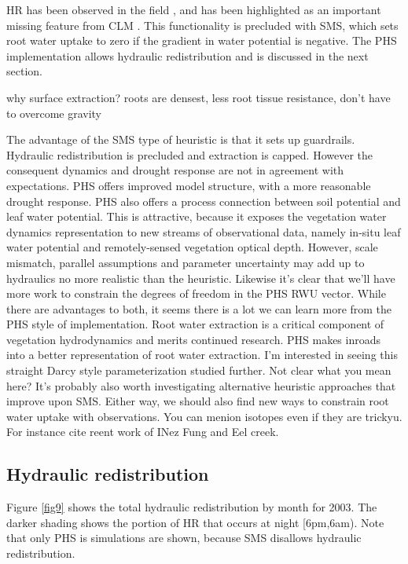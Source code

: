 \documentclass[draft,linenumbers]{agujournal}
\begin{document}
HR has been observed in the field \citep{oliveira2005}, and has been highlighted as an important missing feature from CLM \citep{lee2005}.
This functionality is precluded with SMS, which sets root water uptake to zero if the gradient in water potential is negative. 
The PHS implementation allows hydraulic redistribution and is discussed in the next section.

why surface extraction?
roots are densest, less root tissue resistance, don't have to overcome gravity

The advantage of the SMS type of heuristic is that it sets up guardrails.
Hydraulic redistribution is precluded and extraction is capped.
However the consequent dynamics and drought response are not in agreement with expectations.
PHS offers improved model structure, with a more reasonable drought response.
PHS also offers a process connection between soil potential and leaf water potential.
This is attractive, because it exposes the vegetation water dynamics representation to new streams of observational data, 
namely in-situ leaf water potential and remotely-sensed vegetation optical depth.
However, scale mismatch, parallel assumptions and parameter uncertainty may add up to hydraulics no more realistic than the heuristic.
Likewise it's clear that we'll have more work to constrain the degrees of freedom in the PHS RWU vector.
While there are advantages to both, it seems there is a lot we can learn more from the PHS style of implementation.
Root water extraction is a critical component of vegetation hydrodynamics and merits continued research.
PHS makes inroads into a better representation of root water extraction.
I'm interested in seeing this straight Darcy style parameterization studied further. Not clear what you mean here? 
It's probably also worth investigating alternative heuristic approaches that improve upon SMS.
Either way, we should also find new ways to constrain root water uptake with observations. You can menion isotopes even if they are trickyu. For instance cite reent work of INez Fung and Eel creek.


\subsection{Hydraulic redistribution}

Figure \ref{fig9} shows the total hydraulic redistribution by month for 2003.
The darker shading shows the portion of HR that occurs at night [6pm,6am). 
Note that only PHS is simulations are shown, because SMS disallows hydraulic redistribution.
\end{document}
